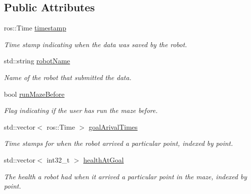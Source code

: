 \subsection*{Public Attributes}
\begin{DoxyCompactItemize}
\item 
\hypertarget{structGameModel_1_1RunData_a7a5adbd64c0373dafac93ab39e3e0217}{ros\-::\-Time \hyperlink{structGameModel_1_1RunData_a7a5adbd64c0373dafac93ab39e3e0217}{timestamp}}\label{structGameModel_1_1RunData_a7a5adbd64c0373dafac93ab39e3e0217}

\begin{DoxyCompactList}\small\item\em Time stamp indicating when the data was saved by the robot. \end{DoxyCompactList}\item 
\hypertarget{structGameModel_1_1RunData_a7ee17ad14e766e04af2cfbda2cbdfd85}{std\-::string \hyperlink{structGameModel_1_1RunData_a7ee17ad14e766e04af2cfbda2cbdfd85}{robot\-Name}}\label{structGameModel_1_1RunData_a7ee17ad14e766e04af2cfbda2cbdfd85}

\begin{DoxyCompactList}\small\item\em Name of the robot that submitted the data. \end{DoxyCompactList}\item 
\hypertarget{structGameModel_1_1RunData_a484c66c26eaa03ea0fb65dd34f583a8f}{bool \hyperlink{structGameModel_1_1RunData_a484c66c26eaa03ea0fb65dd34f583a8f}{run\-Maze\-Before}}\label{structGameModel_1_1RunData_a484c66c26eaa03ea0fb65dd34f583a8f}

\begin{DoxyCompactList}\small\item\em Flag indicating if the user has run the maze before. \end{DoxyCompactList}\item 
\hypertarget{structGameModel_1_1RunData_a23618079bed4bbb5922164e918f84b76}{std\-::vector$<$ ros\-::\-Time $>$ \hyperlink{structGameModel_1_1RunData_a23618079bed4bbb5922164e918f84b76}{goal\-Arival\-Times}}\label{structGameModel_1_1RunData_a23618079bed4bbb5922164e918f84b76}

\begin{DoxyCompactList}\small\item\em Time stamps for when the robot arrived a particular point, indexed by point. \end{DoxyCompactList}\item 
\hypertarget{structGameModel_1_1RunData_abf064d5f2980c5a03227b3ec7345e345}{std\-::vector$<$ int32\-\_\-t $>$ \hyperlink{structGameModel_1_1RunData_abf064d5f2980c5a03227b3ec7345e345}{health\-At\-Goal}}\label{structGameModel_1_1RunData_abf064d5f2980c5a03227b3ec7345e345}

\begin{DoxyCompactList}\small\item\em The health a robot had when it arrived a particular point in the maze, indexed by point. \end{DoxyCompactList}\end{DoxyCompactItemize}


